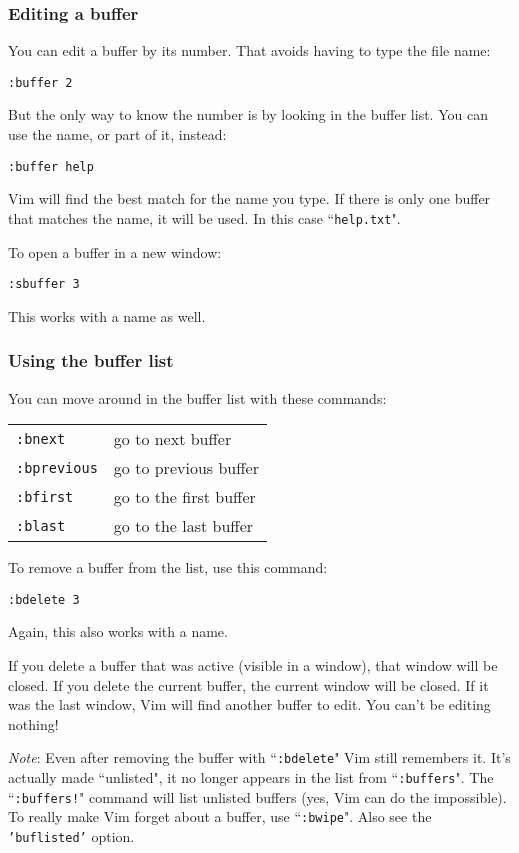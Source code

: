 \subsubsection{Editing a buffer}
You can edit a buffer by its number.
That avoids having to type the file name:

\begin{Verbatim}[samepage=true]
 :buffer 2
\end{Verbatim}

But the only way to know the number is by looking in the buffer list.
You can use the name, or part of it, instead:

\begin{Verbatim}[samepage=true]
 :buffer help
\end{Verbatim}

Vim will find the best match for the name you type.
If there is only one buffer that matches the name, it will be used.
In this case ``\texttt{help.txt}".

To open a buffer in a new window:

\begin{Verbatim}[samepage=true]
 :sbuffer 3
\end{Verbatim}

This works with a name as well.
\subsubsection{Using the buffer list}
You can move around in the buffer list with these commands:

\begin{center} \begin{tabular}{l l}
				\texttt{:bnext} & go to next buffer \\
				\texttt{:bprevious} & go to previous buffer \\
				\texttt{:bfirst} & go to the first buffer \\
				\texttt{:blast} & go to the last buffer
\end{tabular} \end{center}
To remove a buffer from the list, use this command:

\begin{Verbatim}[samepage=true]
 :bdelete 3
\end{Verbatim}

Again, this also works with a name.

If you delete a buffer that was active (visible in a window), that window will be closed.
If you delete the current buffer, the current window will be closed.
If it was the last window, Vim will find another buffer to edit.
You can't be editing nothing!

\emph{Note}: Even after removing the buffer with ``\texttt{:bdelete}" Vim still remembers it.
It's actually made ``unlisted", it no longer appears in the list from ``\texttt{:buffers}".
The ``\texttt{:buffers!}" command will list unlisted buffers (yes, Vim can do the impossible).
To really make Vim forget about a buffer, use ``\texttt{:bwipe}".
Also see the \texttt{'buflisted'} option.
\clearpage
